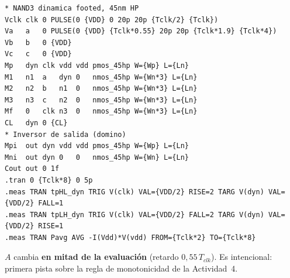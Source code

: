 \documentclass[11pt,a4paper]{article}
\begin{document}
\begin{lstlisting}
* NAND3 dinamica footed, 45nm HP
Vclk clk 0 PULSE(0 {VDD} 0 20p 20p {Tclk/2} {Tclk})
Va   a   0 PULSE(0 {VDD} {Tclk*0.55} 20p 20p {Tclk*1.9} {Tclk*4})
Vb   b   0 {VDD}
Vc   c   0 {VDD}
Mp   dyn clk vdd vdd pmos_45hp W={Wp} L={Ln}
M1   n1  a   dyn 0   nmos_45hp W={Wn*3} L={Ln}
M2   n2  b   n1  0   nmos_45hp W={Wn*3} L={Ln}
M3   n3  c   n2  0   nmos_45hp W={Wn*3} L={Ln}
Mf   0   clk n3  0   nmos_45hp W={Wn*3} L={Ln}
CL   dyn 0 {CL}
* Inversor de salida (domino)
Mpi  out dyn vdd vdd pmos_45hp W={Wp} L={Ln}
Mni  out dyn 0   0   nmos_45hp W={Wn} L={Ln}
Cout out 0 1f
.tran 0 {Tclk*8} 0 5p
.meas TRAN tpHL_dyn TRIG V(clk) VAL={VDD/2} RISE=2 TARG V(dyn) VAL={VDD/2} FALL=1
.meas TRAN tpLH_dyn TRIG V(clk) VAL={VDD/2} FALL=2 TARG V(dyn) VAL={VDD/2} RISE=1
.meas TRAN Pavg AVG -I(Vdd)*V(vdd) FROM={Tclk*2} TO={Tclk*8}
\end{lstlisting}
\begin{nota}
$A$ cambia \textbf{en mitad de la evaluación} (retardo $0{,}55\,T_{clk}$). Es intencional: primera pista sobre la regla de monotonicidad de la Actividad~4.
\end{nota}
\end{document}
